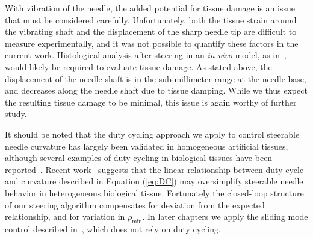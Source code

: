 With vibration of the needle, the added potential for tissue damage is an issue that must be considered carefully. Unfortunately, both the tissue strain around the vibrating shaft and the displacement of the sharp needle tip are difficult to measure experimentally, and it was not possible to quantify these factors in the current work. Histological analysis after steering in an \textit{in vivo} model, as in~\cite{Majewicz2012}, would likely be required to evaluate tissue damage. As stated above, the displacement of the needle shaft is in the sub-millimeter range at the needle base, and decreases along the needle shaft due to tissue damping. While we thus expect the resulting tissue damage to be minimal, this issue is again worthy of further study.

It should be noted that the duty cycling approach we apply to control steerable needle curvature has largely been validated in homogeneous artificial tissues, although several examples of duty cycling in biological tissues have been reported~\cite{Swaney2013,Engh2010,Patil2014}. Recent work~\cite{Patil2014} suggests that the linear relationship between duty cycle and curvature described in Equation (\ref{eq:DC}) may oversimplify steerable needle behavior in heterogeneous biological tissue. Fortunately the closed-loop structure of our steering algorithm compensates for deviation from the expected relationship, and for variation in $\rho_\text{min}$. In later chapters we apply the sliding mode control described in~\cite{Rucker2013}, which does not rely on duty cycling.
